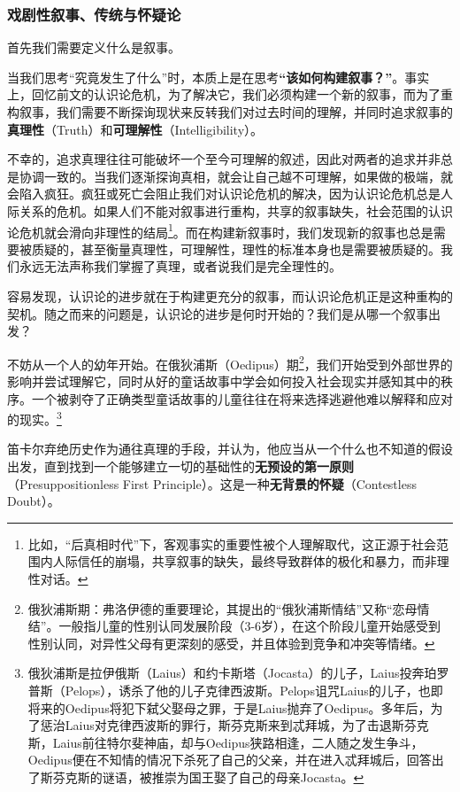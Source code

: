 \documentclass[12pt, a4paper, oneside]{ctexart}
\renewcommand{\b}{\textbf}
\newcommand{\f}{\footnote}
\begin{document}
\subsubsection{戏剧性叙事、传统与怀疑论}

首先我们需要定义什么是叙事。
    
当我们思考“究竟发生了什么”时，本质上是在思考\b{“该如何构建叙事？”}。事实上，回忆前文的认识论危机，为了解决它，我们必须构建一个新的叙事，而为了重构叙事，我们需要不断探询现状来反转我们对过去时间的理解，并同时追求叙事的\b{真理性}（Truth）和\b{可理解性}（Intelligibility）。

不幸的，追求真理往往可能破坏一个至今可理解的叙述，因此对两者的追求并非总是协调一致的。当我们逐渐探询真相，就会让自己越不可理解，如果做的极端，就会陷入疯狂。疯狂或死亡会阻止我们对认识论危机的解决，因为认识论危机总是人际关系的危机。如果人们不能对叙事进行重构，共享的叙事缺失，社会范围的认识论危机就会滑向非理性的结局\f{比如，“后真相时代”下，客观事实的重要性被个人理解取代，这正源于社会范围内人际信任的崩塌，共享叙事的缺失，最终导致群体的极化和暴力，而非理性对话。}。而在构建新叙事时，我们发现新的叙事也总是需要被质疑的，甚至衡量真理性，可理解性，理性的标准本身也是需要被质疑的。我们永远无法声称我们掌握了真理，或者说我们是完全理性的。

容易发现，认识论的进步就在于构建更充分的叙事，而认识论危机正是这种重构的契机。随之而来的问题是，认识论的进步是何时开始的？我们是从哪一个叙事出发？

不妨从一个人的幼年开始。在俄狄浦斯（Oedipus）期\f{俄狄浦斯期：弗洛伊德的重要理论，其提出的“俄狄浦斯情结”又称“恋母情结”。一般指儿童的性别认同发展阶段（3-6岁），在这个阶段儿童开始感受到性别认同，对异性父母有更深刻的感受，并且体验到竞争和冲突等情绪。}，我们开始受到外部世界的影响并尝试理解它，同时从好的童话故事中学会如何投入社会现实并感知其中的秩序。一个被剥夺了正确类型童话故事的儿童往往在将来选择逃避他难以解释和应对的现实。\f{俄狄浦斯是拉伊俄斯（Laius）和约卡斯塔（Jocasta）的儿子，Laius投奔珀罗普斯（Pelops），诱杀了他的儿子克律西波斯。Pelops诅咒Laius的儿子，也即将来的Oedipus将犯下弑父娶母之罪，于是Laius抛弃了Oedipus。多年后，为了惩治Laius对克律西波斯的罪行，斯芬克斯来到忒拜城，为了击退斯芬克斯，Laius前往特尔斐神庙，却与Oedipus狭路相逢，二人随之发生争斗，Oedipus便在不知情的情况下杀死了自己的父亲，并在进入忒拜城后，回答出了斯芬克斯的谜语，被推崇为国王娶了自己的母亲Jocasta。}

笛卡尔弃绝历史作为通往真理的手段，并认为，他应当从一个什么也不知道的假设出发，直到找到一个能够建立一切的基础性的\b{无预设的第一原则}（Presuppositionless First Principle）。这是一种\b{无背景的怀疑}（Contestless Doubt）。
\end{document}

